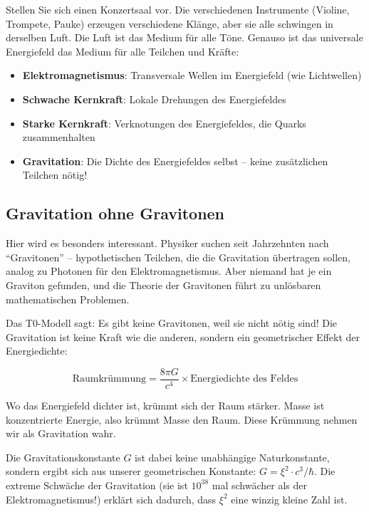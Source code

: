 \documentclass[12pt,a4paper]{article}
\newcommand{\xipar}{\ensuremath{\xi}}
\begin{document}
	\begin{important}
		Stellen Sie sich einen Konzertsaal vor. Die verschiedenen Instrumente (Violine, Trompete, Pauke) erzeugen verschiedene Klänge, aber sie alle schwingen in derselben Luft. Die Luft ist das Medium für alle Töne. Genauso ist das universale Energiefeld das Medium für alle Teilchen und Kräfte:
		\begin{itemize}
			\item \textbf{Elektromagnetismus}: Transversale Wellen im Energiefeld (wie Lichtwellen)
			\item \textbf{Schwache Kernkraft}: Lokale Drehungen des Energiefeldes
			\item \textbf{Starke Kernkraft}: Verknotungen des Energiefeldes, die Quarks zusammenhalten
			\item \textbf{Gravitation}: Die Dichte des Energiefeldes selbst -- keine zusätzlichen Teilchen nötig!
		\end{itemize}
	\end{important}
	
	\subsection{Gravitation ohne Gravitonen}
	
	Hier wird es besonders interessant. Physiker suchen seit Jahrzehnten nach ``Gravitonen'' -- hypothetischen Teilchen, die die Gravitation übertragen sollen, analog zu Photonen für den Elektromagnetismus. Aber niemand hat je ein Graviton gefunden, und die Theorie der Gravitonen führt zu unlösbaren mathematischen Problemen.
	
	\begin{revolutionary}
		Das T0-Modell sagt: Es gibt keine Gravitonen, weil sie nicht nötig sind! Die Gravitation ist keine Kraft wie die anderen, sondern ein geometrischer Effekt der Energiedichte:
		
		\begin{equation}
			\text{Raumkrümmung} = \frac{8\pi G}{c^4} \times \text{Energiedichte des Feldes}
		\end{equation}
		
		Wo das Energiefeld dichter ist, krümmt sich der Raum stärker. Masse ist konzentrierte Energie, also krümmt Masse den Raum. Diese Krümmung nehmen wir als Gravitation wahr.
	\end{revolutionary}
	
	Die Gravitationskonstante $G$ ist dabei keine unabhängige Naturkonstante, sondern ergibt sich aus unserer geometrischen Konstante: $G = \xipar^2 \cdot c^3/\hbar$. Die extreme Schwäche der Gravitation (sie ist $10^{38}$ mal schwächer als der Elektromagnetismus!) erklärt sich dadurch, dass $\xipar^2$ eine winzig kleine Zahl ist.
	
\end{document}
